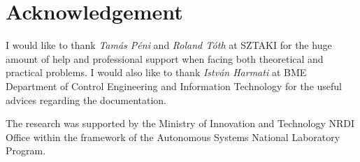 \section*{Acknowledgement}
I would like to thank \textit{Tamás Péni} and \textit{Roland Tóth} at SZTAKI for the huge amount of help and professional support when facing both theoretical and practical problems. I would also like to thank \textit{István Harmati} at BME Department of Control Engineering and Information Technology for the useful advices regarding the documentation.

The research was supported by the Ministry of Innovation and Technology NRDI Office within the framework of the Autonomous Systems National Laboratory Program.